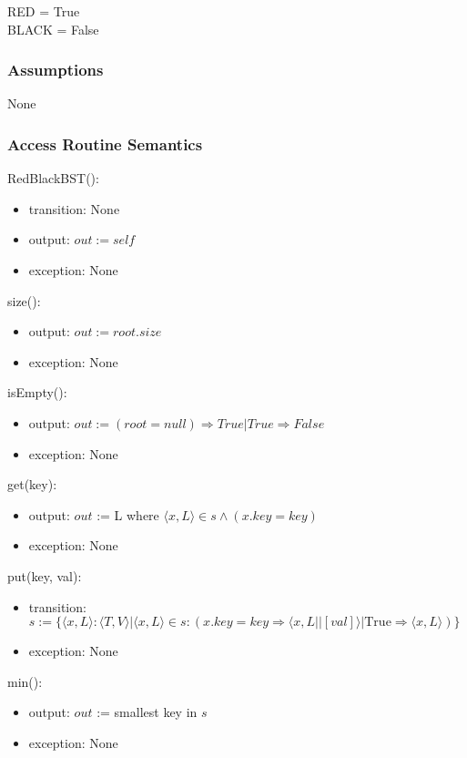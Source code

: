 \documentclass[12pt]{article}
\begin{document}
RED = True\\
BLACK = False

\subsubsection* {Assumptions}

None

\subsubsection* {Access Routine Semantics}

RedBlackBST():
\begin{itemize}
\item transition: None
\item output: $out := \mathit{self}$
\item exception: None
\end{itemize}

\noindent size():
\begin{itemize}
\item output: $out := root.size$
\item exception: None
\end{itemize}

\noindent isEmpty():
\begin{itemize}
\item output: $out := (root = null) \Rightarrow True | True \Rightarrow False$
\item exception: None
\end{itemize}

\noindent get(key):
\begin{itemize}
\item output: $out$ := L where $\langle x, L \rangle \in s \wedge (x.key = \mathit{key})$
\item exception: None
\end{itemize}

\noindent put(key, val):
\begin{itemize}
\item transition: $s := \{ \langle x, L \rangle : \langle T, V \rangle |
  \langle x, L \rangle \in s : (x.key = \mathit{key} \Rightarrow \langle x, L || [val] \rangle
   | \text{True} \Rightarrow \langle x, L \rangle) \}$

\item exception: None
\end{itemize}

\noindent min():
\begin{itemize}
\item output: $out$ := smallest key in $s$
\item exception: None
\end{itemize}
\end{document}
